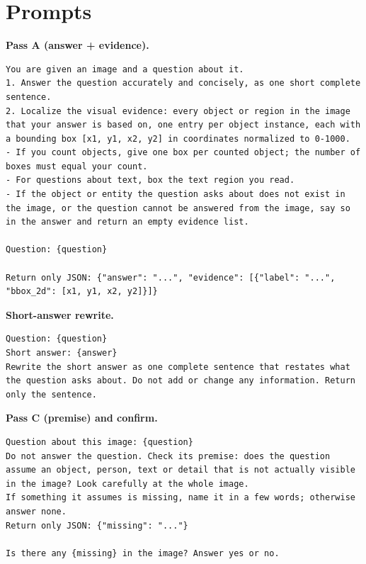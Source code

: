 \documentclass{article}
\begin{document}
\section{Prompts}\label{app:prompts}
\textbf{Pass A (answer + evidence).}
\begin{lstlisting}
You are given an image and a question about it.
1. Answer the question accurately and concisely, as one short complete sentence.
2. Localize the visual evidence: every object or region in the image that your answer is based on, one entry per object instance, each with a bounding box [x1, y1, x2, y2] in coordinates normalized to 0-1000.
- If you count objects, give one box per counted object; the number of boxes must equal your count.
- For questions about text, box the text region you read.
- If the object or entity the question asks about does not exist in the image, or the question cannot be answered from the image, say so in the answer and return an empty evidence list.

Question: {question}

Return only JSON: {"answer": "...", "evidence": [{"label": "...", "bbox_2d": [x1, y1, x2, y2]}]}
\end{lstlisting}
\textbf{Short-answer rewrite.}
\begin{lstlisting}
Question: {question}
Short answer: {answer}
Rewrite the short answer as one complete sentence that restates what the question asks about. Do not add or change any information. Return only the sentence.
\end{lstlisting}
\textbf{Pass C (premise) and confirm.}
\begin{lstlisting}
Question about this image: {question}
Do not answer the question. Check its premise: does the question assume an object, person, text or detail that is not actually visible in the image? Look carefully at the whole image.
If something it assumes is missing, name it in a few words; otherwise answer none.
Return only JSON: {"missing": "..."}

Is there any {missing} in the image? Answer yes or no.
\end{lstlisting}
\end{document}
